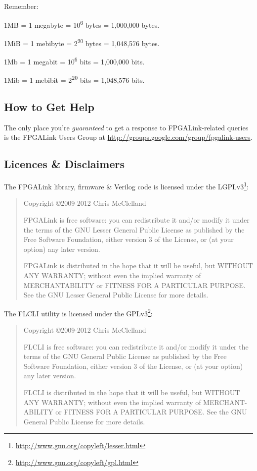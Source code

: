 Remember:
\begin{blobs}
  \item 1MB = 1 megabyte = 10\textsuperscript{6} bytes = 1,000,000 bytes.
  \item 1MiB = 1 mebibyte = 2\textsuperscript{20} bytes = 1,048,576 bytes.
  \item 1Mb = 1 megabit = 10\textsuperscript{6} bits = 1,000,000 bits.
  \item 1Mib = 1 mebibit = 2\textsuperscript{20} bits = 1,048,576 bits.
\end{blobs}

\subsection{How to Get Help}
The only place you're \textit{guaranteed} to get a response to FPGALink-related queries is the FPGALink Users Group at \url{http://groups.google.com/group/fpgalink-users}.

\newpage
\subsection{Licences \& Disclaimers}
The FPGALink library, firmware \& Verilog code is licensed under the LGPLv3\footnote{\url{http://www.gnu.org/copyleft/lesser.html}}:

\begin{quote}
Copyright \copyright 2009-2012 Chris McClelland

FPGALink is free software: you can redistribute it and/or modify it under the terms of the GNU Lesser General Public License as published by the Free Software Foundation, either version 3 of the License, or (at your option) any later version.

FPGALink is distributed in the hope that it will be useful, but WITHOUT ANY WARRANTY; without even the implied warranty of MERCHANTABILITY or FITNESS FOR A PARTICULAR PURPOSE. See the GNU Lesser General Public License for more details.
\end{quote}

The FLCLI utility is licensed under the GPLv3\footnote{\url{http://www.gnu.org/copyleft/gpl.html}}:

\begin{quote}
Copyright \copyright 2009-2012 Chris McClelland

FLCLI is free software: you can redistribute it and/or modify it under the terms of the GNU General Public License as published by the Free Software Foundation, either version 3 of the License, or (at your option) any later version.

FLCLI is distributed in the hope that it will be useful, but WITHOUT ANY WARRANTY; without even the implied warranty of MERCHANT-ABILITY or FITNESS FOR A PARTICULAR PURPOSE. See the GNU General Public License for more details.
\end{quote}

